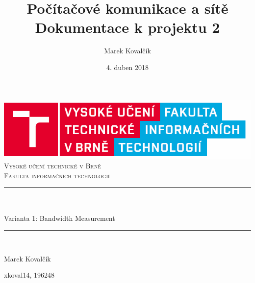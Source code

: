 \documentclass[11pt]{article}
\title{Počítačové komunikace a sítě\\[0.5 cm] Dokumentace k projektu 2}
\author{Marek Kovalčík}
\date{4. duben 2018}
\makeatletter
\let\thetitle\@title
\let\thedate\@date
\makeatother
\begin{document}
	
	
	\begin{titlepage}
		\centering
		\vspace*{0.5 cm}
		\includegraphics[scale = 0.3]{img/logo.png}\\[2.0 cm]
		\textsc{\LARGE Vysoké učení technické v Brně}\\[0.3 cm]
		\textsc{\Large Fakulta informačních technologií}\\[2.0 cm]
		\rule{\linewidth}{0.2 mm} \\[2.0 cm]
		{ \huge \bfseries \thetitle}\\[2.0 cm]
		\LARGE{Varianta 1: Bandwidth Measurement}\\[0.5 cm]
		\rule{\linewidth}{0.2 mm} \\[2.0 cm]
		
		\begin{minipage}{0.4\textwidth}
			\begin{flushleft} \large
				\vspace{1 cm}
				Marek Kovalčík
			\end{flushleft}
		\end{minipage}
		\begin{minipage}{0.4\textwidth}
			\begin{flushright} \large
				\vspace{1 cm}
				xkoval14, 196248 \hspace{1 cm}\\								
			\end{flushright}
		\end{minipage}\\[2 cm]
		
		{\large \thedate}\\[2 cm]
		
		\vfill
		
	\end{titlepage}
	\newpage
	\tableofcontents
	\clearpage
	
	
	
\end{document}
